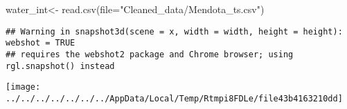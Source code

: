 \documentclass[
]{article}
\newenvironment{Shaded}{\begin{snugshade}}{\end{snugshade}}
\newcommand{\AttributeTok}[1]{\textcolor[rgb]{0.77,0.63,0.00}{#1}}
\newcommand{\DecValTok}[1]{\textcolor[rgb]{0.00,0.00,0.81}{#1}}
\newcommand{\FloatTok}[1]{\textcolor[rgb]{0.00,0.00,0.81}{#1}}
\newcommand{\FunctionTok}[1]{\textcolor[rgb]{0.00,0.00,0.00}{#1}}
\newcommand{\NormalTok}[1]{#1}
\newcommand{\OtherTok}[1]{\textcolor[rgb]{0.56,0.35,0.01}{#1}}
\newcommand{\SpecialCharTok}[1]{\textcolor[rgb]{0.00,0.00,0.00}{#1}}
\newcommand{\StringTok}[1]{\textcolor[rgb]{0.31,0.60,0.02}{#1}}
\begin{document}
\begin{Shaded}
\begin{Highlighting}[]
\NormalTok{water\_int}\OtherTok{\textless{}{-}} \FunctionTok{read.csv}\NormalTok{(}\AttributeTok{file=}\StringTok{"Cleaned\_data/Mendota\_ts.csv"}\NormalTok{)}
\end{Highlighting}
\end{Shaded}

\begin{Shaded}
\end{Shaded}

\begin{verbatim}
## Warning in snapshot3d(scene = x, width = width, height = height): webshot = TRUE
## requires the webshot2 package and Chrome browser; using rgl.snapshot() instead
\end{verbatim}

\texttt{[image: ../../../../../../../AppData/Local/Temp/Rtmpi8FDLe/file43b4163210dd]}
\end{document}
